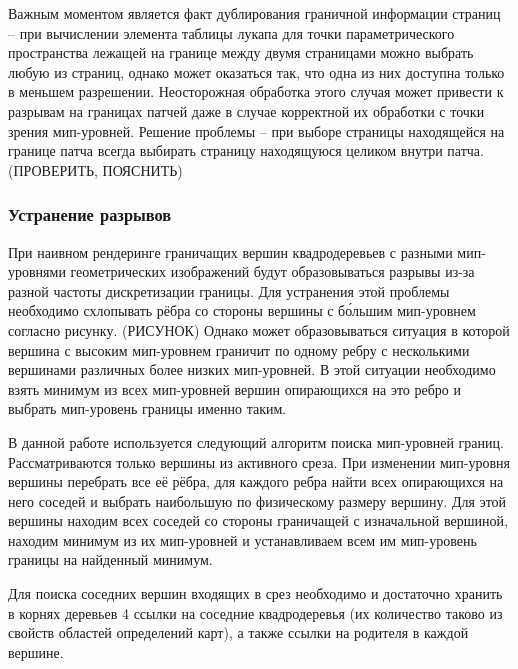 \documentclass[12pt]{extarticle}
\begin{document}
Важным моментом является факт дублирования граничной информации страниц -- при вычислении элемента таблицы лукапа для точки параметрического пространства лежащей на границе между двумя страницами можно выбрать любую из страниц, однако может оказаться так, что одна из них доступна только в меньшем разрешении. Неосторожная обработка этого случая может привести к разрывам на границах патчей даже в случае корректной их обработки с точки зрения мип-уровней. Решение проблемы -- при выборе страницы находящейся на границе патча всегда выбирать страницу находящуюся целиком внутри патча. (ПРОВЕРИТЬ, ПОЯСНИТЬ)

\subsubsection{Устранение разрывов}
При наивном рендеринге граничащих вершин квадродеревьев с разными мип-уровнями геометрических изображений будут образовываться разрывы из-за разной частоты дискретизации границы. Для устранения этой проблемы необходимо схлопывать рёбра со стороны вершины с б\'ольшим мип-уровнем согласно рисунку. (РИСУНОК) Однако может образовываться ситуация в которой вершина с высоким мип-уровнем граничит по одному ребру с несколькими вершинами различных более низких мип-уровней. В этой ситуации необходимо взять минимум из всех мип-уровней вершин опирающихся на это ребро и выбрать мип-уровень границы именно таким.

В данной работе используется следующий алгоритм поиска мип-уровней границ. Рассматриваются только вершины из активного среза. При изменении мип-уровня вершины перебрать все её рёбра, для каждого ребра найти всех опирающихся на него соседей и выбрать наибольшую по физическому размеру вершину. Для этой вершины находим всех соседей со стороны граничащей с изначальной вершиной, находим минимум из их мип-уровней и устанавливаем всем им мип-уровень границы на найденный минимум.

Для поиска соседних вершин входящих в срез необходимо и достаточно хранить в корнях деревьев 4 ссылки на соседние квадродеревья (их количество таково из свойств областей определений карт), а также ссылки на родителя в каждой вершине.
\end{document}
